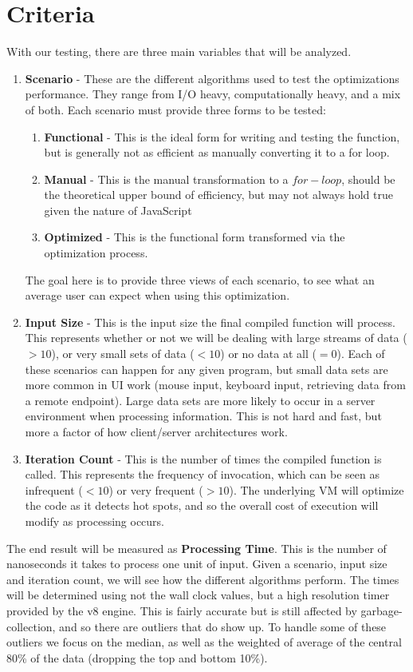\section{Criteria}

With our testing, there are three main variables that will be analyzed.

\begin{enumerate}
  \item \textbf{Scenario} - These are the different algorithms used to test the optimizations performance. They range from I/O heavy, computationally heavy, and a mix of both.  Each scenario must provide three forms to be tested:
    \begin{enumerate}
      \item \textbf{Functional} - This is the ideal form for writing and testing the function, but is generally not as efficient as manually converting it to a for loop.
      \item \textbf{Manual} - This is the manual transformation to a $for-loop$, should be the theoretical upper bound of efficiency, but may not always hold true given the nature of JavaScript
      \item \textbf{Optimized} - This is the functional form transformed via the optimization process.  
    \end{enumerate}
  The goal here is to provide three views of each scenario, to see what an average user can expect when using this optimization.
  \item \textbf{Input Size} - This is the input size the final compiled function will process.  This represents whether or not we will be dealing with large streams of data ($> 10$), or very small sets of data ($< 10$) or no data at all ($=0$).  Each of these scenarios can happen for any given program, but small data sets are more common in UI work (mouse input, keyboard input, retrieving data from a remote endpoint).  Large data sets are more likely to occur in a server environment when processing information. This is not hard and fast, but more a factor of how client/server architectures work. 
  \item \textbf{Iteration Count} - This is the number of times the compiled function is called.  This represents the frequency of invocation, which can be seen as infrequent ($< 10$) or very frequent ($> 10$).  The underlying VM will optimize the code as it detects hot spots, and so the overall cost of execution will modify as processing occurs.  
\end{enumerate}

The end result will be measured as \textbf{Processing Time}. This is the number of nanoseconds it takes to process one unit of input.  Given a scenario, input size and iteration count, we will see how the different algorithms perform.   The times will be determined using not the wall clock values, but a high resolution timer provided by the v8 engine.  This is fairly accurate but is still affected by garbage-collection, and so there are outliers that do show up. To handle some of these outliers we focus on the median, as well as the weighted of average of the central 80\% of the data (dropping the top and bottom 10\%).
